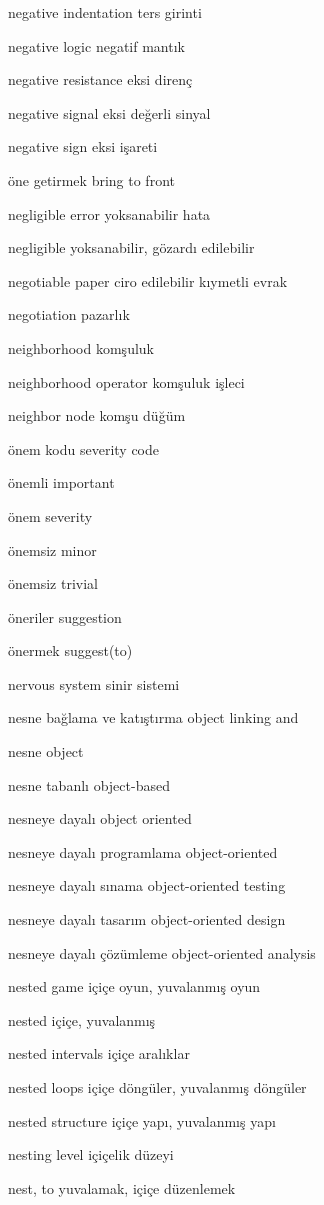 \documentclass[12pt,fleqn]{article}\usepackage{../../common}
\begin{document}
negative indentation ters girinti

negative logic negatif mantık

negative resistance eksi direnç

negative signal eksi değerli sinyal

negative sign eksi işareti

öne getirmek bring to front

negligible error yoksanabilir hata

negligible yoksanabilir, gözardı edilebilir

negotiable paper ciro edilebilir kıymetli evrak

negotiation pazarlık

neighborhood komşuluk

neighborhood operator komşuluk işleci

neighbor node komşu düğüm

önem kodu severity code

önemli important

önem severity

önemsiz minor

önemsiz trivial

öneriler suggestion

önermek suggest(to)

nervous system sinir sistemi

nesne bağlama ve katıştırma object linking and

nesne object

nesne tabanlı object-based

nesneye dayalı object oriented

nesneye dayalı programlama object-oriented

nesneye dayalı sınama object-oriented testing

nesneye dayalı tasarım object-oriented design

nesneye dayalı çözümleme object-oriented analysis

nested game içiçe oyun, yuvalanmış oyun

nested içiçe, yuvalanmış

nested intervals içiçe aralıklar

nested loops içiçe döngüler, yuvalanmış döngüler

nested structure içiçe yapı, yuvalanmış yapı

nesting level içiçelik düzeyi

nest, to yuvalamak, içiçe düzenlemek
\end{document}
